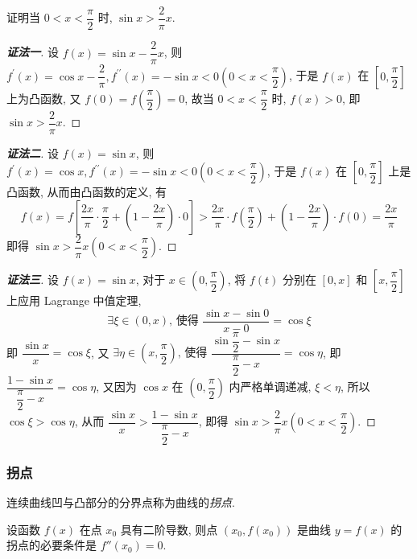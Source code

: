 \begin{example}
    证明当 $0<x<\dfrac{\pi}{2}$ 时, $\sin x>\dfrac{2}{\pi}x.$
\end{example}
\begin{proof}[{\songti \textbf{证法一}}]
    设 $ f(x)=\sin x-\dfrac{2}{\pi} x$, 则 $ f^{\prime}(x)=\cos x-\dfrac{2}{\pi}, f^{\prime \prime}(x)=-\sin x<0\left(0<x<\dfrac{\pi}{2}\right)$, 于是
    $f(x) $ 在 $ \left[0, \dfrac{\pi}{2}\right] $ 上为凸函数, 又 $ f(0)=f\left(\dfrac{\pi}{2}\right)=0$, 故当 $ 0<x<\dfrac{\pi}{2} $ 时, $f(x)>0$, 即 $ \sin x>\dfrac{2}{\pi} x. $
\end{proof}
\begin{proof}[{\songti \textbf{证法二}}]
    设 $ f(x)=\sin x$, 则 $ f^{\prime}(x)=\cos x, f^{\prime \prime}(x)=-\sin x<0\left(0<x<\dfrac{\pi}{2}\right)$, 
    于是 $ f(x) $ 在 $ \left[0, \dfrac{\pi}{2}\right] $ 上是凸函数, 从而由凸函数的定义, 有
    $$f(x)=f\left[\dfrac{2 x}{\pi} \cdot \dfrac{\pi}{2}+\left(1-\dfrac{2 x}{\pi}\right) \cdot 0\right]>\dfrac{2 x}{\pi} \cdot f\left(\dfrac{\pi}{2}\right)+\left(1-\dfrac{2 x}{\pi}\right) \cdot f(0)=\dfrac{2 x}{\pi}$$
    即得 $ \sin x>\dfrac{2}{\pi} x\left(0<x<\dfrac{\pi}{2}\right) .$
\end{proof}
\begin{proof}[{\songti \textbf{证法三}}]
    设 $ f(x)=\sin x$, 对于 $ x \in\left(0, \dfrac{\pi}{2}\right)$, 将 $ f(t) $ 分别在 $ [0, x] $ 和 $ \left[x, \dfrac{\pi}{2}\right] $ 上应用 Lagrange 中值定理, 
    $$\exists\xi \in(0, x) \text{, 使得 }\dfrac{\sin x-\sin 0}{x-0}=\cos \xi$$
    即 $ \dfrac{\sin x}{x}=\cos \xi$, 
    又 $\exists\eta \in\left(x, \dfrac{\pi}{2}\right) \text{, 使得 }\dfrac{\sin \dfrac{\pi}{2}-\sin x}{\dfrac{\pi}{2}-x}=\cos \eta$, 
    即 $ \dfrac{1-\sin x}{\dfrac{\pi}{2}-x}=\cos \eta$, 
    又因为 $ \cos x $ 在 $ \left(0, \dfrac{\pi}{2}\right) $ 内严格单调递减, $\xi<\eta$, 所以 $ \cos \xi>\cos \eta$, 
    从而 $ \dfrac{\sin x}{x}>\dfrac{1-\sin x}{\dfrac{\pi}{2}-x}$, 即得 $ \sin x>\dfrac{2}{\pi} x\left(0<x<\dfrac{\pi}{2}\right) .$
\end{proof}

\subsubsection{拐点}

\begin{definition}[拐点]
    连续曲线凹与凸部分的分界点称为曲线的\textit{拐点}.
\end{definition}

\begin{theorem}[拐点存在的必要条件]
    设函数 $f(x)$ 在点 $x_0$ 具有二阶导数, 则点 $(x_0,f(x_0))$ 是曲线 $y=f(x)$ 的拐点的必要条件是 $f''(x_0)=0.$
\end{theorem}

